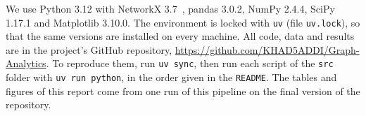 We use Python 3.12 with NetworkX 3.7~\cite{hagberg2008}, pandas 3.0.2,
NumPy 2.4.4, SciPy 1.17.1 and Matplotlib 3.10.0. The environment is locked
with \texttt{uv} (file \texttt{uv.lock}), so that the same versions are
installed on every machine. All code, data and results are in the project's
GitHub repository, \url{https://github.com/KHAD5ADDI/Graph-Analytics}. To
reproduce them, run \texttt{uv sync}, then run each script of the
\texttt{src} folder with \texttt{uv run python}, in the order given in the
\texttt{README}. The tables and figures of this report come from one run of
this pipeline on the final version of the repository.
